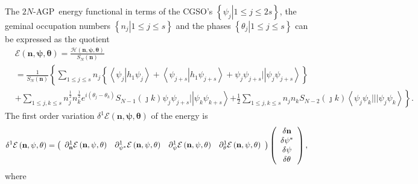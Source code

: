 \documentclass[aps,preprint]{revtex4}%
\begin{document}
The $2N$-AGP\ energy functional in terms of the CGSO's $\left\{  \left.
\psi_{j}\right\vert 1\leq j\leq2s\right\}  $, the geminal occupation numbers
$\left\{  \left.  n_{j}\right\vert 1\leq j\leq s\right\}  $ and the phases
$\left\{  \left.  \theta_{j}\right\vert 1\leq j\leq s\right\}  $ can be
expressed as the quotient%
\begin{align}
&  \mathcal{E}\left(  \mathbf{n},\mathbf{\psi},\mathbf{\theta}\right)
=\frac{\mathcal{H}\left(  \mathbf{n},\mathbf{\psi},\mathbf{\theta}\right)
}{S_{N}\left(  \mathbf{n}\right)  }\nonumber\\
&  =\frac{1}{S_{N}\left(  \mathbf{n}\right)  }\left\{  \sum_{1\leq j\leq
s}n_{j}\left\{  \left\langle \psi_{j}\left\vert h_{1}\psi_{j}\right.
\right\rangle +\left\langle \psi_{j+s}\left\vert h_{1}\psi_{j+s}\right.
\right\rangle +\psi_{j}\psi_{j+s}|\left\vert \psi_{j}\psi_{j+s}\right\rangle
\right\}  \right. \nonumber\\
&  +\sum_{1\leq j,k\leq s}n_{j}^{\frac{1}{2}}n_{k}^{\frac{1}{2}}e^{i\left(
\theta_{j}-\theta_{k}\right)  }S_{N-1}\left(  \jmath k\right)  \psi_{j}%
\psi_{j+s}|\left\vert \psi_{k}\psi_{k+s}\right\rangle \left.  +\frac{1}{2}%
\sum_{1\leq j,k\leq s}n_{j}n_{k}S_{N-2}\left(  \jmath k\right)  \left\langle
\psi_{j}\psi_{k}|||\psi_{j}\psi_{k}\right\rangle \right\}  .
\end{align}
The first order variation $\delta^{1}\mathcal{E}\left(  \mathbf{n}%
,\mathbf{\psi},\mathbf{\theta}\right)  $ of the energy is
\begin{equation}
\delta^{1}\mathcal{E}\left(  \mathbf{n},\mathbf{\psi},\mathbf{\theta}\right)
=\left(
\begin{array}
[c]{cccc}%
\partial_{\mathbf{n}}^{1}\mathcal{E}\left(  \mathbf{n},\mathbf{\psi
},\mathbf{\theta}\right)  & \partial_{\mathbf{\psi}^{\ast}}^{1}\mathcal{E}%
\left(  \mathbf{n},\mathbf{\psi},\mathbf{\theta}\right)  & \partial
_{\mathbf{\psi}}^{1}\mathcal{E}\left(  \mathbf{n},\mathbf{\psi},\mathbf{\theta
}\right)  & \partial_{\mathbf{\theta}}^{1}\mathcal{E}\left(  \mathbf{n}%
,\mathbf{\psi},\mathbf{\theta}\right)
\end{array}
\right)  \left(
\begin{array}
[c]{c}%
\delta\mathbf{n}\\
\delta\mathbf{\psi}^{\ast}\\
\delta\mathbf{\psi}\\
\delta\mathbf{\theta}%
\end{array}
\right)  ,
\end{equation}
where
\end{document}
